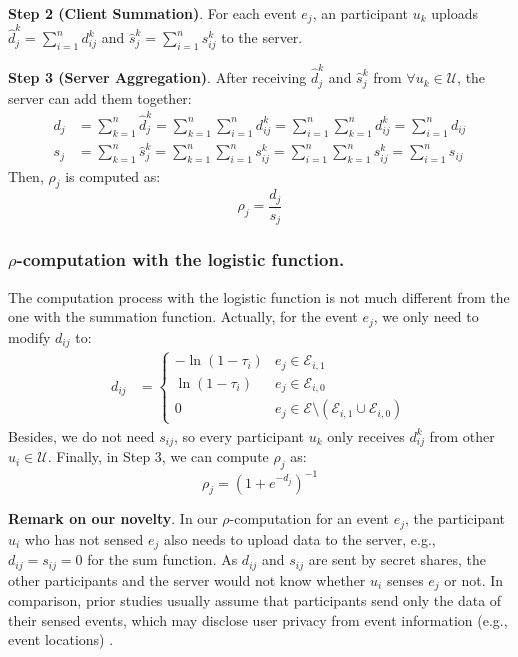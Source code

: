 \documentclass[11pt]{article}
\begin{document}
\textbf{Step 2 (Client Summation)}. For each event $e_j$, an participant $u_k$ uploads $\hat d_{j}^k=\sum_{i=1}^n d_{ij}^k$ and $\hat s_{j}^k = \sum_{i=1}^n s_{ij}^k$ to the server.

\textbf{Step 3 (Server Aggregation)}. After receiving $\hat d_{j}^k$ and $\hat s_{j}^k$ from $\forall u_k \in \mathcal U$, the server can add them together:
\begin{align}
	d_j & = \sum_{k=1}^n \hat d_{j}^k = \sum_{k=1}^n\sum_{i=1}^n d_{ij}^k = \sum_{i=1}^n \sum_{k=1}^n d_{ij}^k = \sum_{i=1}^n d_{ij} \\
	s_j & = \sum_{k=1}^n \hat s_{j}^k = \sum_{k=1}^n\sum_{i=1}^n s_{ij}^k = \sum_{i=1}^n \sum_{k=1}^n s_{ij}^k = \sum_{i=1}^n s_{ij}
\end{align}
Then, $\rho_j$ is computed as:
\begin{equation}
	\rho_j = \frac{d_j}{s_j}
\end{equation}


\subsubsection{$\rho$-computation with the logistic function.} The computation process with the logistic function is not much different from the one with the summation function. Actually, for the event $e_j$, we only need to modify $d_{ij}$ to:
 \begin{align}
 	d_{ij} & =
 	\begin{cases}
 		-\ln(1-\tau_i) & e_j \in \mathcal E_{i,1} \\
 	    \ln (1-\tau_i) & e_j \in \mathcal E_{i,0}\\
 		0 & e_j \in \mathcal E\setminus(\mathcal E_{i,1}\cup \mathcal E_{i,0})
 	\end{cases}
 \end{align}
Besides, we do not need $s_{ij}$, so every participant $u_k$ only receives $d_{ij}^k$ from other $u_i \in \mathcal U$. Finally, in Step 3, we can compute $\rho_j$ as:
\begin{equation}
	\rho_j = (1+e^{-d_j})^{-1}
\end{equation}

\textbf{Remark on our novelty}. In our $\rho$-computation for an event $e_j$, the participant $u_i$ who has not sensed $e_j$ also needs to upload data to the server, e.g., $d_{ij}=s_{ij}=0$ for the sum function. As $d_{ij}$ and $s_{ij}$ are sent by secret shares, the other participants and the server would not know whether $u_i$ senses $e_j$ or not. In comparison, prior studies usually assume that participants send only the data of their sensed events, which may disclose user privacy from event information (e.g., event locations) \cite{Leye-Miao2015CloudEnabledPT,Leye-Miao2017ALP,Leye-Miao2019PrivacyPreservingTD,Leye-Zheng2018LearningTT,Leye-Zheng2020PrivacyAwareAE,Leye-Zhang2021ReliableAP}.
\end{document}
